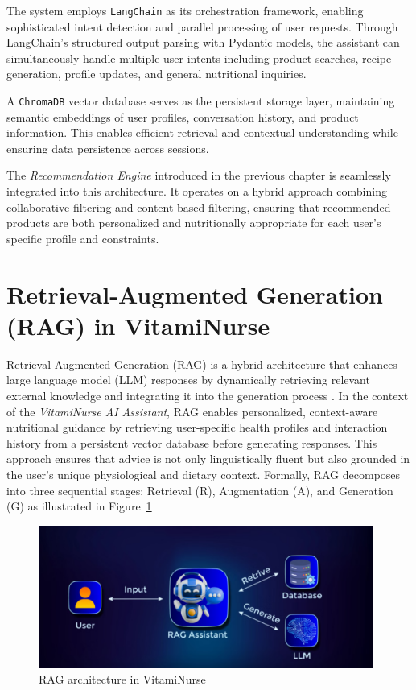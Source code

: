 The system employs \texttt{LangChain} as its orchestration framework, enabling sophisticated intent detection and parallel processing of user requests. Through LangChain's structured output parsing with Pydantic models, the assistant can simultaneously handle multiple user intents including product searches, recipe generation, profile updates, and general nutritional inquiries.

A \texttt{ChromaDB} vector database serves as the persistent storage layer, maintaining semantic embeddings of user profiles, conversation history, and product information. This enables efficient retrieval and contextual understanding while ensuring data persistence across sessions.

The \emph{Recommendation Engine} introduced in the previous chapter is seamlessly integrated into this architecture. It operates on a hybrid approach combining collaborative filtering and content-based filtering, ensuring that recommended products are both personalized and nutritionally appropriate for each user's specific profile and constraints.


\section{Retrieval-Augmented Generation (RAG) in VitamiNurse}
\label{sec:rag}

\par Retrieval-Augmented Generation (RAG) is a hybrid architecture that enhances large language model (LLM) responses by dynamically retrieving relevant external knowledge and integrating it into the generation process \cite{lewis2020retrieval}. In the context of the \textit{VitamiNurse AI Assistant}, RAG enables personalized, context-aware nutritional guidance by retrieving user-specific health profiles and interaction history from a persistent vector database before generating responses. This approach ensures that advice is not only linguistically fluent but also grounded in the user’s unique physiological and dietary context. Formally, RAG decomposes into three sequential stages: Retrieval (R), Augmentation (A), and Generation (G) as illustrated in Figure~\ref{fig:RAG_architecture}

\begin{center}
\begin{figure}[H]
\includegraphics[width=0.98\textwidth]{images/RAG_logic.png}
\caption{RAG architecture in VitamiNurse} 
\label{fig:RAG_architecture}
\end{figure}
\end{center}

